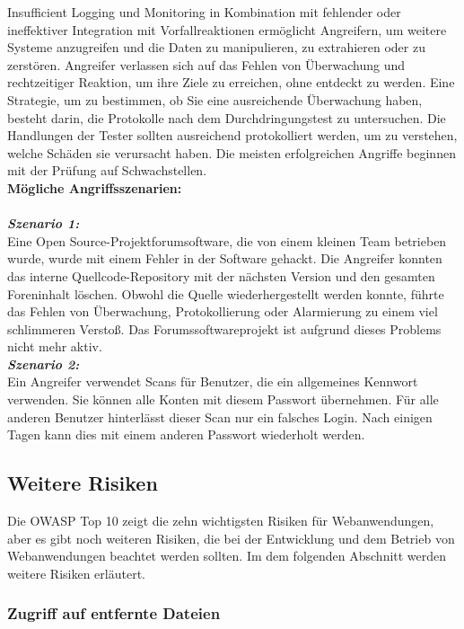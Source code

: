 Insufficient Logging und Monitoring in Kombination mit fehlender oder ineffektiver Integration mit Vorfallreaktionen ermöglicht Angreifern, um weitere Systeme anzugreifen und die Daten zu manipulieren, zu extrahieren oder zu zerstören\cite[6]{owasp17top10}. Angreifer verlassen sich auf das Fehlen von Überwachung und rechtzeitiger Reaktion, um ihre Ziele zu erreichen, ohne entdeckt zu werden. Eine Strategie, um zu bestimmen, ob Sie eine ausreichende Überwachung haben, besteht darin, die Protokolle nach dem Durchdringungstest zu untersuchen. Die Handlungen der Tester sollten ausreichend protokolliert werden, um zu verstehen, welche Schäden sie verursacht haben. Die meisten erfolgreichen Angriffe beginnen mit der Prüfung auf Schwachstellen\cite[16]{owasp17top10}.\\

\textbf{Mögliche Angriffsszenarien:}\\
\\
\textbf{\textit{Szenario 1:}}\\
Eine Open Source-Projektforumsoftware, die von einem kleinen Team betrieben wurde, wurde mit einem Fehler in der Software gehackt. Die Angreifer konnten das interne Quellcode-Repository mit der nächsten Version und den gesamten Foreninhalt löschen. Obwohl die Quelle wiederhergestellt werden konnte, führte das Fehlen von Überwachung, Protokollierung oder Alarmierung zu einem viel schlimmeren Verstoß. Das Forumssoftwareprojekt ist aufgrund dieses Problems nicht mehr aktiv\cite[16]{owasp17top10}.\\

\textbf{\textit{Szenario 2:}}\\
Ein Angreifer verwendet Scans für Benutzer, die ein allgemeines Kennwort verwenden. Sie können alle Konten mit diesem Passwort übernehmen. Für alle anderen Benutzer hinterlässt dieser Scan nur ein falsches Login. Nach einigen Tagen kann dies mit einem anderen Passwort wiederholt werden\cite[16]{owasp17top10}.

\subsection{Weitere Risiken}

Die OWASP Top 10 zeigt die zehn wichtigsten Risiken für Webanwendungen, aber es gibt noch weiteren Risiken, die bei der Entwicklung und dem Betrieb von Webanwendungen beachtet werden sollten. Im dem folgenden Abschnitt werden weitere Risiken erläutert.

\subsubsection{Zugriff auf entfernte Dateien}


